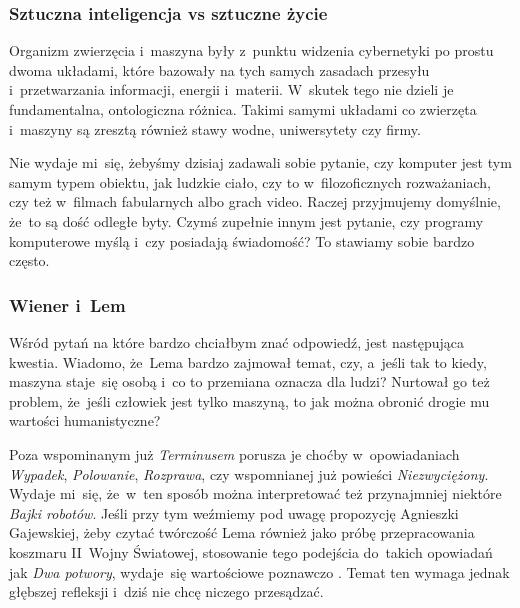 \documentclass[10pt,t]{beamer}
\begin{document}
\begin{frame}
  \frametitle{Sztuczna inteligencja vs sztuczne życie}


  Organizm zwierzęcia i~maszyna były z~punktu widzenia cybernetyki po
  prostu dwoma układami, które bazowały na tych samych zasadach przesyłu
  i~przetwarzania informacji, energii i~materii. W~skutek tego nie dzieli
  je fundamentalna, ontologiczna różnica. Takimi samymi układami co
  zwierzęta i~maszyny są zresztą również stawy wodne, uniwersytety czy
  firmy.

  Nie wydaje mi~się, żebyśmy dzisiaj zadawali sobie pytanie, czy komputer
  jest tym samym typem obiektu, jak ludzkie ciało, czy to w~filozoficznych
  rozważaniach, czy też w~filmach fabularnych albo grach video. Raczej
  przyjmujemy domyślnie, że~to są dość odległe byty. Czymś zupełnie innym
  jest pytanie, czy \alert{programy} komputerowe myślą i~czy posiadają
  świadomość? To stawiamy sobie bardzo często.

\end{frame}





\begin{frame}
  \frametitle{Wiener i~Lem}


  Wśród pytań na które bardzo chciałbym znać odpowiedź, jest następująca
  kwestia. Wiadomo, że~Lema bardzo zajmował temat, czy, a~jeśli tak to
  kiedy, maszyna staje~się osobą i~co to przemiana oznacza dla ludzi?
  Nurtował go też problem, że~jeśli człowiek jest tylko maszyną, to
  jak można obronić drogie mu wartości humanistyczne?

  Poza wspominanym już \textit{Terminusem} porusza je choćby w~opowiadaniach
  \textit{Wypadek}, \textit{Polowanie}, \textit{Rozprawa}, czy wspomnianej
  już powieści \textit{Niezwyciężony}. Wydaje mi~się, że~w~ten sposób można
  interpretować też przynajmniej niektóre \textit{Bajki robotów}. Jeśli
  przy tym weźmiemy pod uwagę propozycję Agnieszki Gajewskiej, żeby czytać
  twórczość Lema również jako próbę przepracowania koszmaru II~Wojny
  Światowej, stosowanie tego podejścia do~takich opowiadań jak
  \textit{Dwa potwory}, wydaje~się wartościowe poznawczo
  \parencite{Gajewska-Zaglada-i-gwiazdy-Pub-2017}. Temat ten wymaga jednak
  głębszej refleksji i~dziś nie chcę niczego przesądzać.

\end{frame}
\end{document}
